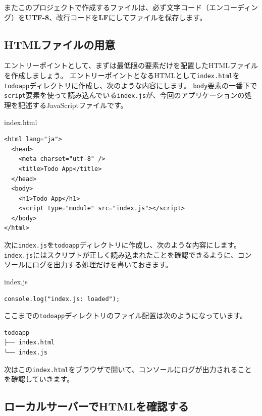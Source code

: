 またこのプロジェクトで作成するファイルは、必ず文字コード（エンコーディング）を\textbf{UTF-8}、改行コードを\textbf{LF}にしてファイルを保存します。

\hypertarget{preparing-html}{%
\subsection{HTMLファイルの用意}\label{preparing-html}}

エントリーポイントとして、まずは最低限の要素だけを配置したHTMLファイルを作成しましょう。
エントリーポイントとなるHTMLとして\texttt{index.html}を\texttt{todoapp}ディレクトリに作成し、次のような内容にします。
\texttt{body}要素の一番下で\texttt{script}要素を使って読み込んでいる\texttt{index.js}が、今回のアプリケーションの処理を記述するJavaScriptファイルです。

\begin{listtitle}
index.html
\end{listtitle}
\begin{lstlisting}
<html lang="ja">
  <head>
    <meta charset="utf-8" />
    <title>Todo App</title>
  </head>
  <body>
    <h1>Todo App</h1>
    <script type="module" src="index.js"></script>
  </body>
</html>
\end{lstlisting}
\listend

次に\texttt{index.js}を\texttt{todoapp}ディレクトリに作成し、次のような内容にします。
\texttt{index.js}にはスクリプトが正しく読み込まれたことを確認できるように、コンソールにログを出力する処理だけを書いておきます。

\begin{listtitle}
index.js
\end{listtitle}
\begin{lstlisting}
console.log("index.js: loaded");
\end{lstlisting}
\listend

ここまでの\texttt{todoapp}ディレクトリのファイル配置は次のようになっています。

\begin{lstlisting}
todoapp
├── index.html
└── index.js
\end{lstlisting}

次はこの\texttt{index.html}をブラウザで開いて、コンソールにログが出力されることを確認していきます。

\hypertarget{local-server}{%
\subsection{ローカルサーバーでHTMLを確認する}\label{local-server}}

